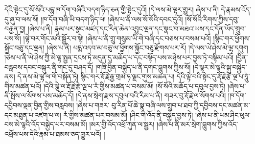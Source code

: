 དེའི་སྟེང་དུ་སོ་སོའི་པདྨ་ཁ་དོག་བཞིའི་བདག་ཉིད་ཅན་གྱི་སྟེང་དུའོ། །དེ་ལས་མེ་ལྷར་གྱུར། ཞེས་པ་ནི། དེ་རྣམས་འོད་དུ་ཞུ་བ་ལས་སོ། །ཁ་དོག་བཞི་ཡི་བདག་ཉིད་ལ། །ཞེས་པ་ནི་ལས་སོ་སོའི་དབང་དུའོ། །སོ་སོའི་རིགས་ཀྱིས་དབུ་བརྒྱན་བྱ། །ཞེས་པ་ནི། རྣམ་པར་སྣང་མཛད་དང་རིན་ཆེན་འབྱུང་ལྡན་དང་སྣང་བ་མཐའ་ཡས་དང་དོན་ཡོད་གྲུབ་པས་སོ། །ལྟེ་བར་གོང་མའི་སྦྱོར་བ་སྟེ། །ཞེས་པ་ནི་གྲུ་གསུམ་ཡི་གེ་བཞི་དང་བཅས་པ་བསམ་པའོ། །སྙིང་གར་ཕྱོགས་སྐྱོང་བཅུ་དང་ལྡན། །ཞེས་པ་ནི། པདྨ་འདབ་མ་བཅུ་ལ་ཕྱོགས་སྐྱོང་བཅུ་རྫོགས་པར་རོ། །དེ་ལས་ཡེ་ཤེས་མེ་ལྷ་དགུག །ཅེས་པ་ནི་ཡེ་ཤེས་ཀྱི་མེ་ལྷ་སྤྱན་དྲངས་ཏེ་མདུན་དུ་མཆོད་པ་དང་བསྟོད་པས་མཉེས་པར་བྱས་ཏེ་བསྟིམ་པའོ། །བྱིན་བརླབས་དབང་བསྐུར་ནི་གང་དུ་བཤད་དོ། །གཟི་བྱིན་བསྐྱེད་པ་ནི་དགང་བླུགས་ཀྱིས་སོ། །དེ་ལྟར་མེ་ལྷའི་སྐུ་བསྐྱེད་ནས། དེ་ནས་མེ་ལྷ་ལ་གོ་བསྐོན་ཏེ། སྙིང་གར་རྡོ་རྗེ་རྒྱ་གྲམ་ཧ་ལྗང་གུས་མཚན་པ། དེའི་ལྟེ་བའི་སྟེང་དུ་རྡོ་རྗེ་རྩེ་ལྔ་པ་ཧཱུཾ་གིས་མཚན་པའོ། །དེའི་ལྕེ་ལ་རྡོ་རྗེ་རྩེ་ལྔ་པ་རཾ་གྱིས་མཚན་པ་བསམ་མོ། །སོ་སོའི་མཆོད་པ་དབུལ་བྱས་ཏེ། །ཞེས་པ་ནི་སྤོས་ལ་སོགས་པས་མཆོད་དོ། །དེ་ནས་སྲེག་རྫས་དབུལ་བའི་རིམ་པ་ནི། གཟར་བུ་རྡོ་རྗེ་ལ་སོགས་པའི། །ཁ་དོག་དབྱིབས་ལྡན་བྱིན་གྱིས་བརླབས། །ཞེས་པ་གཟར་​ བུ་རིན་པོ་ཆེ་སྣ་བཞི་ལས་གྲུབ་པ་ཐབ་ཀྱི་དབྱིབས་དང་མཚན་མ་དང་མཐུན་པ་འཛག་པ་ལ། རཾ་གྱིས་མཚན་པར་བསམ་མོ། །ཤིང་གི་འོད་ནི་བསྐྱེད་བྱས་ཏེ། །ཞེས་པ་ནི་ཡམ་ཤིང་ཕུལ་བས་མེ་ལྷའི་འོད་བསྐྱེད་པར་བསམ་མོ། །མར་གྱི་འོད་འཕྲོ་ཀུན་ལ་སྦྱར། །ཞེས་པ་ནི་མར་སྲེག་བླུགས་ཀྱིས་འོད་འཕྲོས་པས་དེའི་རྣམ་པ་ཐམས་ཅད་གྱུར་པའོ། །
